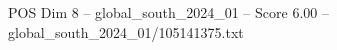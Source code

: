 \begin{textsample}{POS Dim 8 – global\_south\_2024\_01 – Score 6.00 – global\_south\_2024\_01/105141375.txt}
\end{textsample}
